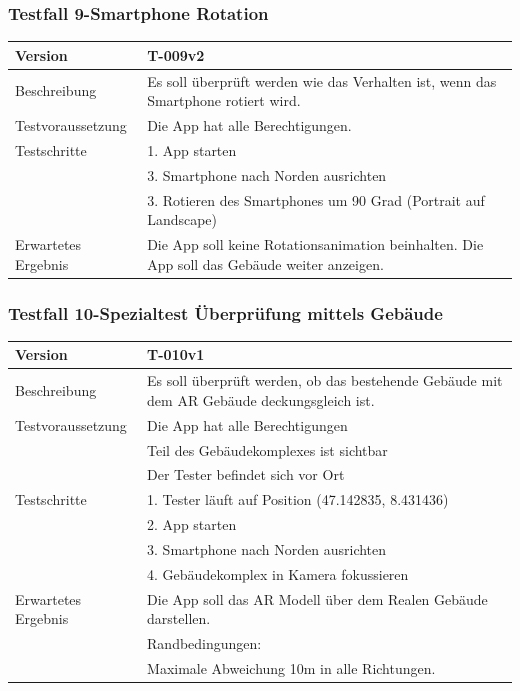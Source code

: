 \documentclass[a4paper]{scrreprt}
\begin{document}
\subsubsection{Testfall 9-Smartphone Rotation}
\begin{tabularx}{\textwidth}{|l|X|}
\hline
	Version &
	T-009v2 \\
\hline
	Beschreibung &
	Es soll überprüft werden wie das Verhalten ist, wenn das Smartphone rotiert wird. \\
\hline
	Testvoraussetzung &
	Die App hat alle Berechtigungen. \\ 
\hline 
	Testschritte & 
		1. App starten\\ &
		3. Smartphone nach Norden ausrichten\\ &
		3. Rotieren des Smartphones um 90 Grad (Portrait auf Landscape)\\
\hline
	Erwartetes Ergebnis &
	Die App soll keine Rotationsanimation beinhalten. Die App soll das Gebäude weiter anzeigen. \\
\hline
\end{tabularx}
\subsubsection{Testfall 10-Spezialtest Überprüfung mittels Gebäude}
\begin{tabularx}{\textwidth}{|l|X|}
\hline
	Version &
	T-010v1 \\ 
\hline 
	Beschreibung & 
	Es soll überprüft werden, ob das bestehende Gebäude mit dem AR Gebäude deckungsgleich ist. \\ 
\hline 
	Testvoraussetzung &
	Die App hat alle Berechtigungen\\ &
	Teil des Gebäudekomplexes ist sichtbar\\ &
	Der Tester befindet sich vor Ort\\ 
\hline 
	Testschritte & 
		1. Tester läuft auf Position (47.142835, 8.431436)\\ &
		2. App starten\\ &
		3. Smartphone nach Norden ausrichten\\ &
		4. Gebäudekomplex in Kamera fokussieren\\
\hline
	Erwartetes Ergebnis &
	Die App soll das AR Modell über dem Realen Gebäude darstellen. \\ &
	Randbedingungen: \\ &
		Maximale Abweichung 10m in alle Richtungen.\\
\hline
\end{tabularx}
\end{document}
